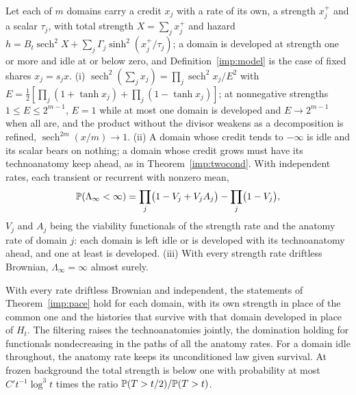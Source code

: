 \begin{theorem}\label{imp:domains}
Let each of $m$ domains carry a credit $x_j$ with a rate of its own, a
strength $x_j^+$ and a scalar $\tau_j$, with total strength
$X=\sum_jx_j^+$ and hazard
$h=B_t\operatorname{sech}^2X+\sum_j\Gamma_j\sinh^2(x_j^+/\tau_j)$; a domain
is developed at strength one or more and idle at or below zero, and
Definition~\ref{imp:model} is the case of fixed shares $x_j=s_jx$. (i)
$\operatorname{sech}^2(\sum_jx_j)=\prod_j\operatorname{sech}^2x_j/E^2$ with
$E=\tfrac12[\prod_j(1+\tanh x_j)+\prod_j(1-\tanh x_j)]$; at nonnegative
strengths $1\le E\le2^{m-1}$, $E=1$ while at most one domain is developed
and $E\to2^{m-1}$ when all are, and the product without the divisor
weakens as a decomposition is refined, $\operatorname{sech}^{2m}(x/m)\to1$.
(ii) A domain whose credit tends to $-\infty$ is idle and its scalar bears
on nothing; a domain whose credit grows must have its technoanatomy keep
ahead, as in Theorem~\ref{imp:twocond}. With independent rates, each
transient or recurrent with nonzero mean,
\[
\mathbb{P}(\Lambda_\infty<\infty)=\prod_j\bigl(1-V_j+V_jA_j\bigr)-\prod_j\bigl(1-V_j\bigr),
\]
$V_j$ and $A_j$ being the viability functionals of the strength rate and
the anatomy rate of domain $j$: each domain is left idle or is developed
with its technoanatomy ahead, and one at least is developed. (iii) With
every strength rate driftless Brownian, $\Lambda_\infty=\infty$ almost
surely.
\end{theorem}

\begin{theorem}\label{imp:pacedomains}
With every rate driftless Brownian and independent, the statements of
Theorem~\ref{imp:pace} hold for each domain, with its own strength in
place of the common one and the histories that survive with that domain
developed in place of $H_t$. The filtering raises the technoanatomies
jointly, the domination holding for functionals nondecreasing in the
paths of all the anatomy rates. For a domain idle throughout, the anatomy
rate keeps its unconditioned law given survival. At frozen background the
total strength is below one with probability at most $C't^{-1}\log^3t$
times the ratio $\mathbb{P}(T>t/2)/\mathbb{P}(T>t)$.
\end{theorem}

